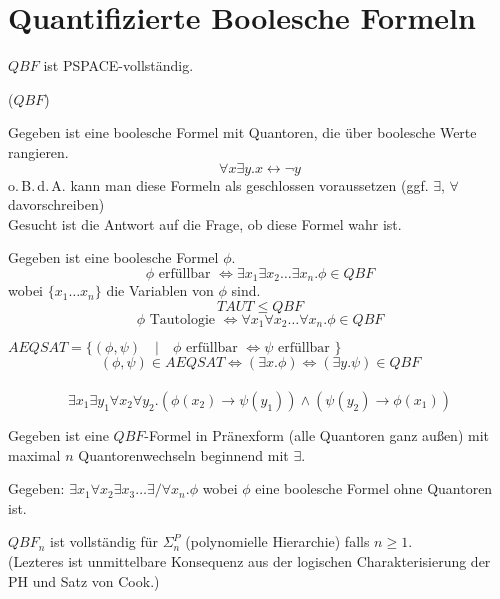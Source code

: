 




\section{Quantifizierte Boolesche Formeln}


\begin{satz}
    $QBF$ ist PSPACE-vollständig.
    
\end{satz}


 ($QBF$)

Gegeben ist eine boolesche Formel mit Quantoren, die über boolesche Werte rangieren.
$$ \forall x \exists y . x \leftrightarrow \neg y  $$
o.\,B.\,d.\,A. kann man diese Formeln als geschlossen voraussetzen (ggf. $\exists$, $\forall$ davorschreiben)
\\
Gesucht ist die Antwort auf die Frage, ob diese Formel wahr ist.



Gegeben ist eine boolesche Formel $\phi$.
$$ \phi \text{ erfüllbar } \Longleftrightarrow \exists x_1 \exists x_2 \dots \exists x_n . \phi \in QBF $$
wobei $\{ x_1 \dots x_n \}$ die Variablen von $\phi$ sind.
\\
$$ TAUT \leq QBF $$
$$ \phi \text{ Tautologie } \Longleftrightarrow \forall x_1 \forall x_2 \dots \forall x_n . \phi \in QBF $$


$AEQSAT = \{ (\phi, \psi) \quad | \quad \phi \text{ erfüllbar } \Leftrightarrow \psi \text{ erfüllbar } \}$ 
$$(\phi, \psi) \in AEQSAT \Longleftrightarrow (\exists x . \phi ) \Leftrightarrow (\exists y. \psi) \in QBF $$
\\
$$\exists x_1 \exists y_1 \forall x_2 \forall y_2 . (\phi(x_2) \rightarrow \psi(y_1)) \land (\psi(y_2) \rightarrow \phi(x_1))$$






Gegeben ist eine $QBF$-Formel in Pränexform (alle Quantoren ganz außen) mit maximal $n$ Quantorenwechseln beginnend mit $\exists$.

Gegeben: $\exists x_1 \forall x_2 \exists x_3 \dots \exists/\forall x_n . \phi$ wobei $\phi$ eine boolesche Formel ohne Quantoren ist.

$QBF_n$ ist vollständig für $\Sigma_n^P$ (polynomielle Hierarchie) falls $n \geq 1$.
\\
(Lezteres ist unmittelbare Konsequenz aus der logischen Charakterisierung der PH und Satz von Cook.)




